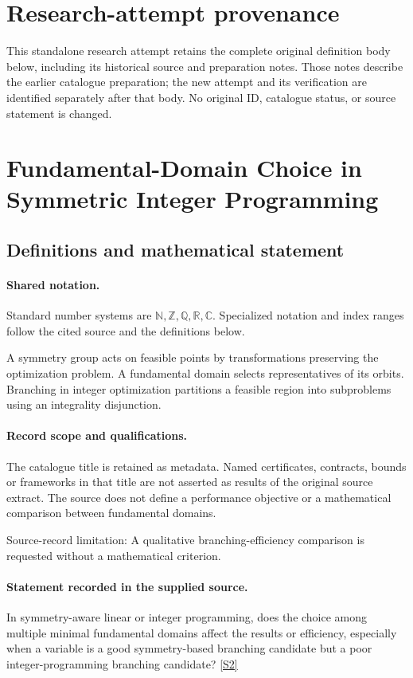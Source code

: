 \documentclass[11pt]{article}
\begin{document}
\section*{Research-attempt provenance}
This standalone research attempt retains the complete original definition body below,
including its historical source and preparation notes. Those notes describe the
earlier catalogue preparation; the new attempt and its verification are identified
separately after that body. No original ID, catalogue status, or source statement is changed.

\section{Fundamental-Domain Choice in Symmetric Integer Programming}\label{statement}

\subsection{Definitions and mathematical statement}

\paragraph{Shared notation.}Standard number systems are $\mathbb N,\mathbb Z,\mathbb Q,\mathbb R,\mathbb C$. Specialized notation and index ranges follow the cited source and the definitions below.


A symmetry group acts on feasible points by transformations preserving the optimization problem. A fundamental domain selects representatives of its orbits. Branching in integer optimization partitions a feasible region into subproblems using an integrality disjunction.
\paragraph{Record scope and qualifications.}
The catalogue title is retained as metadata. Named certificates, contracts, bounds or frameworks in that title are not asserted as results of the original source extract.
The source does not define a performance objective or a mathematical comparison between fundamental domains.

Source-record limitation: A qualitative branching-efficiency comparison is requested without a mathematical criterion.
\paragraph{Statement recorded in the supplied source.}
In symmetry-aware linear or integer programming, does the choice among multiple minimal fundamental domains affect the results or efficiency, especially when a variable is a good symmetry-based branching candidate but a poor integer-programming branching candidate? \href{https://doi.org/10.4171/owr/2010/38}{[S2]}
\end{document}
